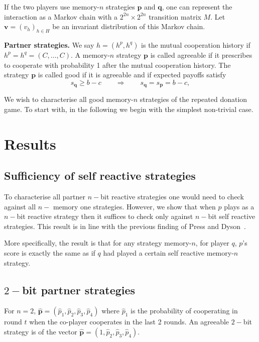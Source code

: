 \documentclass{article}
\theoremstyle{definition}
\begin{document}
If the two players use memory-$n$ strategies $\mathbf{p}$ and $\mathbf{q}$, one
can represent the interaction as a Markov chain with a $2^{2n}\!\times\!2^{2n}$
transition matrix $M$. Let $\mathbf{v}=(v_h)_{h\in H}$ be an invariant
distribution of this Markov chain. 

{\bf Partner strategies.}  We say $h\!=\!(h^p,h^q)$ is the mutual cooperation
history if $h^p\!=\!h^q\!=\!(C,\ldots,C)$. A memory-$n$ strategy $\mathbf{p}$ is
called agreeable if it prescribes to cooperate with probability 1 after the
mutual cooperation history. The strategy $\mathbf{p}$ is called good if it is
agreeable and if expected payoffs satisfy
\begin{equation} \label{Eq:good}
    s_{\mathbf{q}} \geq b\!-\!c \qquad \Rightarrow \qquad s_{\mathbf{q}} = s_{\mathbf{p}} =  b\!-\!c,
\end{equation}

We wish to characterise all good memory-$n$ strategies of the repeated donation
game. To start with, in the following we begin with the simplest non-trivial
case.


\section{Results}

\subsection{Sufficiency of self reactive strategies}

To characterise all partner $n-$bit reactive strategies one would need to check
against all $n-$ memory one strategies. However, we show that when $p$ plays as
a $n-$bit reactive strategy then it suffices to check only against $n-$bit
self reactive strategies. This result is in line with the 
previous finding of Press and Dyson~\cite{press:PNAS:2012}.

More specifically, the result is that for any strategy memory-$n$, for player
\(q\), \(p\)'s score is exactly the same as if \(q\) had played a certain self
reactive memory-$n$ strategy.

\subsection{$2-$bit partner strategies}

For $n=2$, $\mathbf{\hat{p}}=(\hat{p}_1, \hat{p}_2, \hat{p}_3, \hat{p}_4)$ where
$\hat{p}_1$ is the probability of cooperating in round $t$ when the co-player
cooperates in the last 2 rounds. An agreeable $2-$bit strategy is of the
vector $\mathbf{\hat{p}}=(1, \hat{p}_2, \hat{p}_3, \hat{p}_4)$.
\end{document}
